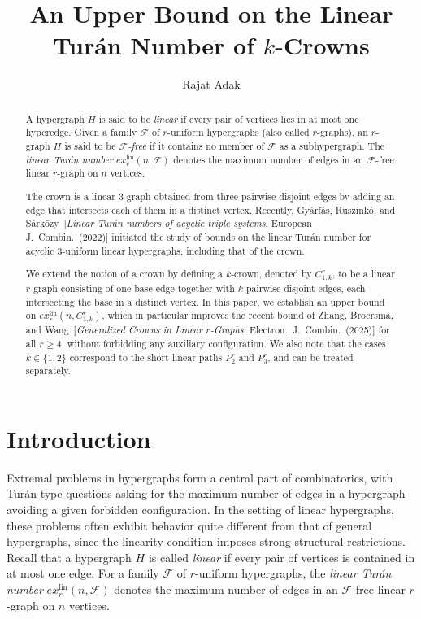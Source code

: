\documentclass[12pt]{article}
\title{An Upper Bound on the Linear Tur\'{a}n Number of
$k$-Crowns}
\author{Rajat Adak}
\date{}
\begin{document}
\maketitle
\begin{abstract}
    A hypergraph $H$ is said to be \emph{linear} if every pair of vertices lies in at most one hyperedge.
Given a family $\mathcal{F}$ of $r$-uniform hypergraphs (also called $r$-graphs), an $r$-graph $H$ is said to be \emph{$\mathcal{F}$-free} if it contains no member of $\mathcal{F}$ as a subhypergraph.
The \emph{linear Tur\'{a}n number} $ex_r^{\mathrm{lin}}(n,\mathcal{F})$ denotes the maximum number of edges in an $\mathcal{F}$-free linear $r$-graph on $n$ vertices.

The crown is a linear $3$-graph obtained from three pairwise disjoint edges by adding an edge that intersects each of them in a distinct vertex. Recently, Gy\'arf\'as, Ruszink\'o, and S\'ark\"ozy~[\emph{Linear Tur\'an numbers of acyclic triple systems}, European J.\ Combin.\ (2022)] initiated the study of bounds on the linear Tur\'an number for acyclic $3$-uniform linear hypergraphs, including that of the crown.

We extend the notion of a crown by defining a $k$-crown, denoted by $C_{1,k}^r$, to be a linear $r$-graph consisting of one base edge together with $k$ pairwise disjoint edges, each intersecting the base in a distinct vertex. In this paper, we establish an upper bound on $ex_r^{\mathrm{lin}}(n,C_{1,k}^r)$, which in particular improves the recent bound of Zhang, Broersma, and Wang~[\emph{Generalized Crowns in Linear $r$-Graphs}, Electron.\ J.\ Combin.\ (2025)] for all $r \geq 4$, without forbidding any auxiliary configuration. We also note that the cases $k\in\{1,2\}$ correspond to the short linear paths $P_2^r$ and $P_3^r$, and can be treated separately.
\end{abstract}
\section{Introduction}
Extremal problems in hypergraphs form a central part of combinatorics, with Tur\'an-type questions asking for the maximum number of edges in a hypergraph avoiding a given forbidden configuration. In the setting of linear hypergraphs, these problems often exhibit behavior quite different from that of general hypergraphs, since the linearity condition imposes strong structural restrictions. Recall that a hypergraph $H$ is called \emph{linear} if every pair of vertices is contained in at most one edge. For a family $\mathcal{F}$ of $r$-uniform hypergraphs, the \emph{linear Tur\'an number} $ex_r^{\mathrm{lin}}(n,\mathcal{F})$ denotes the maximum number of edges in an $\mathcal{F}$-free linear $r$-graph on $n$ vertices.
\end{document}
